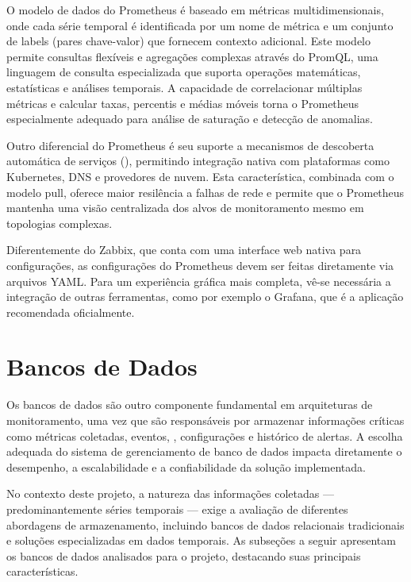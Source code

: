 {O modelo de dados do Prometheus é baseado em métricas multidimensionais, onde cada série temporal é identificada por um nome de métrica e um conjunto de labels (pares chave-valor) que fornecem contexto adicional. Este modelo permite consultas flexíveis e agregações complexas através do PromQL, uma linguagem de consulta especializada que suporta operações matemáticas, estatísticas e análises temporais. A capacidade de correlacionar múltiplas métricas e calcular taxas, percentis e médias móveis torna o Prometheus especialmente adequado para análise de saturação e detecção de anomalias.

Outro diferencial do Prometheus é seu suporte a mecanismos de descoberta automática de serviços (), permitindo integração nativa com plataformas como Kubernetes, DNS e provedores de nuvem. Esta característica, combinada com o modelo pull, oferece maior resilência a falhas de rede e permite que o Prometheus mantenha uma visão centralizada dos alvos de monitoramento mesmo em topologias complexas.

Diferentemente do Zabbix, que conta com uma interface web nativa para configurações, as configurações do Prometheus devem ser feitas diretamente via arquivos YAML. Para um experiência gráfica mais completa, vê-se necessária a integração de outras ferramentas, como por exemplo o Grafana, que é a aplicação recomendada oficialmente.

}


\section{Bancos de Dados}
\label{section:BancosDados}

{\color{red}

Os bancos de dados são outro componente fundamental em arquiteturas de monitoramento, uma vez que são responsáveis por armazenar informações críticas como métricas coletadas, eventos, , configurações e histórico de alertas. A escolha adequada do sistema de gerenciamento de banco de dados impacta diretamente o desempenho, a escalabilidade e a confiabilidade da solução implementada.

No contexto deste projeto, a natureza das informações coletadas — predominantemente séries temporais — exige a avaliação de diferentes abordagens de armazenamento, incluindo bancos de dados relacionais tradicionais e soluções especializadas em dados temporais. As subseções a seguir apresentam os bancos de dados analisados para o projeto, destacando suas principais características.

}

